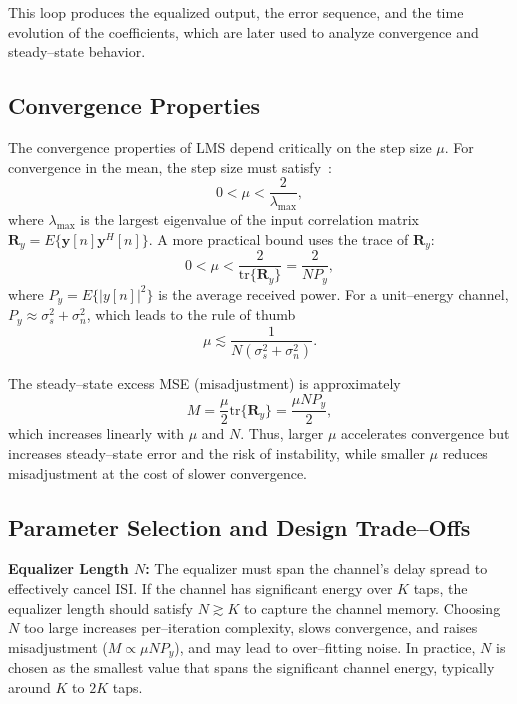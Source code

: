 \documentclass[12pt]{article}
\begin{document}
This loop produces the equalized output, the error sequence, and the time evolution of the coefficients, which are later used to analyze convergence and steady--state behavior.

\subsection{Convergence Properties}
The convergence properties of LMS depend critically on the step size $\mu$. For convergence in the mean, the step size must satisfy~\cite{haykin}:
\begin{equation}
0 < \mu < \frac{2}{\lambda_{\max}},
\end{equation}
where $\lambda_{\max}$ is the largest eigenvalue of the input correlation matrix $\mathbf{R}_y = E\{\mathbf{y}[n]\mathbf{y}^H[n]\}$. A more practical bound uses the trace of $\mathbf{R}_y$:
\begin{equation}
0 < \mu < \frac{2}{\mathrm{tr}\{\mathbf{R}_y\}} = \frac{2}{N P_y},
\end{equation}
where $P_y = E\{|y[n]|^2\}$ is the average received power. For a unit--energy channel, $P_y \approx \sigma_s^2 + \sigma_n^2$, which leads to the rule of thumb
\begin{equation}
\mu \lesssim \frac{1}{N(\sigma_s^2 + \sigma_n^2)}.
\end{equation}

The steady--state excess MSE (misadjustment) is approximately
\begin{equation}
M = \frac{\mu}{2} \mathrm{tr}\{\mathbf{R}_y\} = \frac{\mu N P_y}{2},
\end{equation}
which increases linearly with $\mu$ and $N$. Thus, larger $\mu$ accelerates convergence but increases steady--state error and the risk of instability, while smaller $\mu$ reduces misadjustment at the cost of slower convergence.

\subsection{Parameter Selection and Design Trade--Offs}

\textbf{Equalizer Length $N$:} The equalizer must span the channel's delay spread to effectively cancel ISI. If the channel has significant energy over $K$ taps, the equalizer length should satisfy $N \gtrsim K$ to capture the channel memory. Choosing $N$ too large increases per--iteration complexity, slows convergence, and raises misadjustment ($M \propto \mu N P_y$), and may lead to over--fitting noise. In practice, $N$ is chosen as the smallest value that spans the significant channel energy, typically around $K$ to $2K$ taps.
\end{document}
